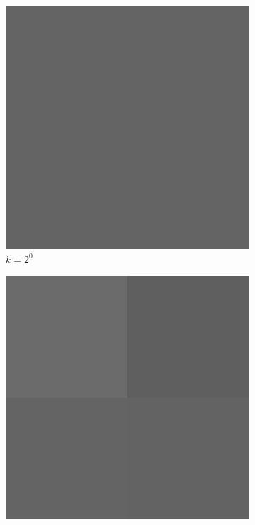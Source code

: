 \begin{figure}[H]
    \centering
    \caption{Result of Low Frequency Image After DHWT}
    \begin{subfigure}[b]{0.3\textwidth}
        \centering
        \includegraphics[width=\textwidth]{problem2/low_freq_1.bmp}
        \caption{$k = 2^0$}
    \end{subfigure}
    \hfill
    \begin{subfigure}[b]{0.3\textwidth}
        \centering
        \includegraphics[width=\textwidth]{problem2/low_freq_2.bmp}

\end{subfigure}
\end{figure}
